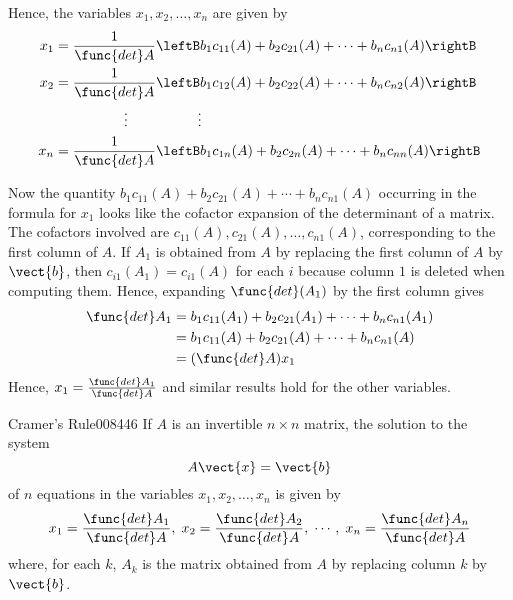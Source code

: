 Hence, the variables $x_{1}, x_{2}, \dots, x_{n}$ are given by
\begin{align*}
x_1 &= \frac{1}{\func{det } A} \leftB b_1c_{11}(A) + b_2c_{21}(A) + \cdots + b_nc_{n1}(A)\rightB \\
x_2 &= \frac{1}{\func{det } A} \leftB b_1c_{12}(A) + b_2c_{22}(A) + \cdots + b_nc_{n2}(A)\rightB \\
& \hspace{5em} \vdots \hspace{5em} \vdots\\
x_n &= \frac{1}{\func{det } A} \leftB b_1c_{1n}(A) + b_2c_{2n}(A) + \cdots + b_nc_{nn}(A)\rightB 
\end{align*}

Now the quantity $b_{1}c_{11}(A) + b_{2}c_{21}(A) + \cdots + b_{n}c_{n1}(A)$ occurring in the formula for $x_{1}$ looks like the cofactor expansion of the determinant of a matrix. The cofactors involved are $c_{11}(A), c_{21}(A), \dots, c_{n1}(A)$, corresponding to the first column of $A$. If $A_{1}$ is obtained from $A$ by replacing the first column of $A$ by $\vect{b}$, then $c_{i1}(A_{1}) = c_{i1}(A)$ for each $i$ because column $1$ is deleted when computing them. Hence, expanding $\func{det}(A_{1})$ by the first column gives
\begin{align*}
\func{det } A_1 &= b_1c_{11}(A_1) + b_2c_{21}(A_1) + \cdots + b_nc_{n1}(A_1) \\
 	 &= b_1c_{11}(A) + b_2c_{21}(A) + \cdots + b_nc_{n1}(A)\\
	 &= (\func{det } A)x_1 
\end{align*}
Hence, $x_1 = \frac{\func{det } A_1}{\func{det } A}$
 and similar results hold for the other variables.

\begin{theorem}{Cramer's Rule\footnotemark}{008446}
If $A$ is an invertible $n \times n$ matrix, the solution to the system
\begin{equation*}
A\vect{x}=\vect{b}
\end{equation*}
of $n$ equations in the variables $x_{1}, x_{2}, \dots, x_{n}$ is given by
\begin{equation*}
x_1 = \frac{\func{det } A_1}{\func{det } A}, \; x_2 = \frac{\func{det } A_2}{\func{det } A}, \;\cdots, \; x_n = \frac{\func{det } A_n}{\func{det } A}
\end{equation*}
where, for each $k$, $A_k$ is the matrix obtained from $A$ by replacing column $k$ by $\vect{b}$. 
\end{theorem}

